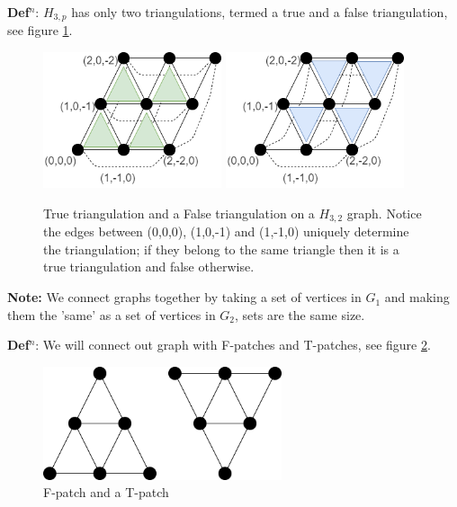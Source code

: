 \documentclass[a4paper,11pt]{report}
\begin{document}
\textbf{Def$^n$}: $H_{3,p}$ has only two triangulations, termed a true and a false triangulation, see figure \ref{truefalsetri}. 

\begin{figure}[h!]
\begin{center}
		\includegraphics[height=40mm]{figures/holyer_true_triangulation.png}
		\includegraphics[height=40mm]{figures/holyer_false_triangulation.png}
\end{center}
		\caption{True triangulation and a False triangulation on a $H_{3,2}$ graph. Notice the edges between (0,0,0), (1,0,-1) and (1,-1,0) uniquely determine the triangulation; if they belong to the same triangle then it is a true triangulation and false otherwise.}
		\label{truefalsetri}
\end{figure}

\textbf{Note:} We connect graphs together by taking a set of vertices in $G_1$ and making them the 'same' as a set of vertices in $G_2$, sets are the same size.

\textbf{Def$^n$}: We will connect out graph with F-patches and T-patches, see figure \ref{patches}. 

\begin{figure}[h!]
\begin{center}
		\includegraphics[width=70mm]{figures/patches.png}
\end{center}
		\caption{F-patch and a T-patch}
		\label{patches}
\end{figure}
\end{document}
